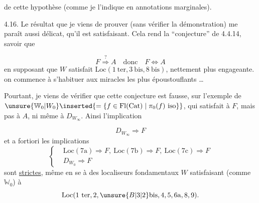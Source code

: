 
de cette hypothèse (comme je l'indique en annotations marginales).

4.16. Le résultat que je viens de prouver (sans vérifier  la démonstration) me paraît aussi délicat, qu'il est satisfaisant. Cela  rend la ``conjecture''  de 4.4.14, savoir que

\[
 F\overset{?}{\Rightarrow}A\quad\text{donc}\quad F\Leftrightarrow A
\]
en supposant que $W$ satisfait $\mathrm{Loc}(1\ \mathrm{ter},3\ \mathrm{bis},8\ \mathrm{bis})$, nettement plus engageante.  on commence à s'habituer aux miracles les plus époustouflants \ldots


Pourtant, je viens de vérifier que cette conjecture est fausse, sur l'exemple de $\unsure{\mathbb W_0|W_0}\inserted{=\{f\in\mathrm{Fl}(\mathrm{Cat})\mid\pi_0(f)\ \mathrm{iso}\}}$, qui satisfait à $F$, mais pas à $A$, ni même à $D_{W_\infty}$. Ainsi l'implication

\[
 D_{W_\infty}\Longrightarrow F
\]
et a fortiori les implications
\[
 \left\{\begin{aligned}
 &\mathrm{Loc}(7\mathrm a)\Rightarrow F,\ \mathrm{Loc}(7\mathrm b)\Rightarrow F,\ \mathrm{Loc}(7\mathrm c)\Rightarrow F\\
 &D_{W_0}\Longrightarrow F
 \end{aligned}\right.
\]
sont \uline{strictes}, même en se  à des localiseurs fondamentaux $W$ satisfaisant (comme $\mathbb W_0$) à
\[
 \mathrm{Loc}(1\ \mathrm{ter},2,\unsure{B|3|2}\mathrm{bis},4,5,6\mathrm a,8,9).
\]
